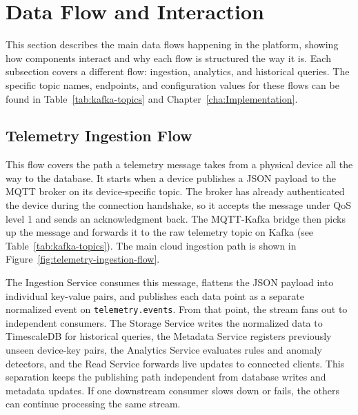 
\section{Data Flow and Interaction}
\label{sec:ProposedModelDataFlowAndInteraction}

This section describes the main data flows happening in the platform, showing how components interact and why each flow is structured the way it is. Each subsection covers a different flow: ingestion, analytics, and historical queries. The specific topic names, endpoints, and configuration values for these flows can be found in Table~\ref{tab:kafka-topics} and Chapter~\ref{cha:Implementation}.

\subsection{Telemetry Ingestion Flow}
This flow covers the path a telemetry message takes from a physical device all the way to the database. It starts when a device publishes a \gls{JSON} payload to the \gls{MQTT} broker on its device-specific topic. The broker has already authenticated the device during the connection handshake, so it accepts the message under \gls{QoS} level 1 and sends an acknowledgment back. The \gls{MQTT}-Kafka bridge then picks up the message and forwards it to the raw telemetry topic on Kafka (see Table~\ref{tab:kafka-topics}). The main cloud ingestion path is shown in Figure~\ref{fig:telemetry-ingestion-flow}.

The Ingestion Service consumes this message, flattens the \gls{JSON} payload into individual key-value pairs, and publishes each data point as a separate normalized event on \texttt{telemetry.events}. From that point, the stream fans out to independent consumers. The Storage Service writes the normalized data to TimescaleDB for historical queries, the Metadata Service registers previously unseen device-key pairs, the Analytics Service evaluates rules and anomaly detectors, and the Read Service forwards live updates to connected clients. This separation keeps the publishing path independent from database writes and metadata updates. If one downstream consumer slows down or fails, the others can continue processing the same stream.

